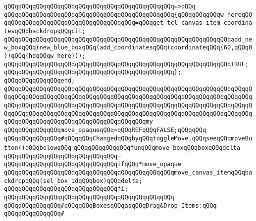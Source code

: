 \verb|qQQqqQQqqQQqqQQqqQQqqQQqqQQqqQQqqQQqqQQqqQQqqQQq=>qQQq|\newline
\verb|qQQqqQQqqQQqqQQqqQQqqQQqqQQqqQQqqQQqqQQqqQQqqQQq{qQQqqQQqqQQqw_hereqQQqqQQqqQQqqQQqqQQqqQQqqQQqqQQqqQQqqQQq=qQQqget_tcl_canvas_item_coordinatesqQQqbackdropqQQqcit;|\newline
\verb|qQQqqQQqqQQqqQQqqQQqqQQqqQQqqQQqqQQqqQQqqQQqqQQqqQQqqQQqqQQqqQQqadd_new_boxqQQq(new_blue_boxqQQq(add_coordinatesqQQq(coordinateqQQq(60,qQQq0))qQQq(hdqQQqw_here)));|\newline
\verb|qQQqqQQqqQQqqQQqqQQqqQQqqQQqqQQqqQQqqQQqqQQqqQQqqQQqqQQqqQQqqQQqTRUE;|\newline
\verb|qQQqqQQqqQQqqQQqqQQqqQQqqQQqqQQqqQQqqQQqqQQqqQQq};|\newline
\verb|qQQqqQQqqQQqqQQqend;|\newline
\newline
\newline
\verb|qQQqqQQqqQQqqQQqqQQqqQQqqQQqqQQqqQQqqQQqqQQqqQQqqQQqqQQqqQQqqQQqqQQqqQQqqQQqqQQqqQQqqQQqqQQqqQQqqQQqqQQqqQQqqQQqqQQqqQQqqQQqqQQqqQQqqQQqqQQqqQQqqQQqqQQqqQQqqQQqqQQqqQQqqQQqqQQqqQQqqQQqqQQqqQQqqQQqqQQqqQQqqQQqqQQqqQQqqQQqqQQqqQQqqQQqqQQqqQQqqQQqqQQqqQQqqQQqqQQqqQQqqQQqqQQqqQQqqQQqqQQqqQQqqQQqqQQqqQQqqQQqqQQqqQQqqQQqqQQqmy|\newline
\verb|qQQqqQQqqQQqqQQqmove_opaqueqQQq=qQQqREFqQQqFALSE;qQQqqQQq|\newline
\newline
\verb|qQQqqQQqqQQqqQQq#qQQqqQQqChangedqQQqbyqQQqtoggleMove,qQQqseeqQQqmoveButton()qQQqbelowqQQq|\newline
\newline
\verb|qQQqqQQqqQQqqQQqfunqQQqmove_boxqQQqboxqQQqdelta|\newline
\verb|qQQqqQQqqQQqqQQqqQQqqQQqqQQqqQQq=|\newline
\verb|qQQqqQQqqQQqqQQqqQQqqQQqqQQqqQQqifqQQq*move_opaque|\newline
\verb|qQQqqQQqqQQqqQQqqQQqqQQqqQQqqQQqqQQqqQQqqQQqqQQqmove_canvas_itemqQQqbackdropqQQq(sel_box_idqQQqbox)qQQqdelta;|\newline
\verb|qQQqqQQqqQQqqQQqqQQqqQQqqQQqqQQqfi;|\newline
\verb|qQQqqQQqqQQqqQQqqQQqqQQqqQQqqQQqqQQqqQQqqQQqqQQq|\newline
\newline
\newline
\verb|qQQqqQQqqQQqqQQq#qQQqqQQqBoxesqQQqasqQQqDrag&Drop-Items:qQQq|\newline
\verb|qQQqqQQqqQQqqQQq#|\newline
